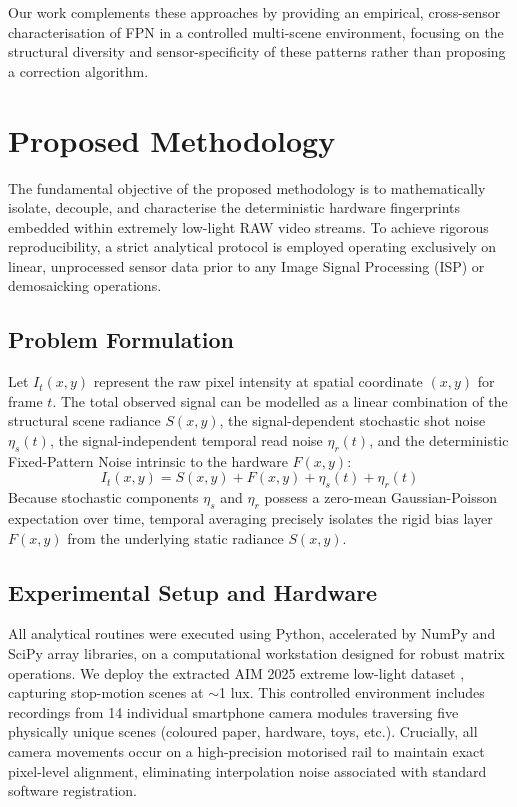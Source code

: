\documentclass[conference]{IEEEtran}
\begin{document}
Our work complements these approaches by providing an empirical, cross-sensor characterisation of FPN in a controlled multi-scene environment, focusing on the structural diversity and sensor-specificity of these patterns rather than proposing a correction algorithm.

\section{Proposed Methodology}

The fundamental objective of the proposed methodology is to mathematically isolate, decouple, and characterise the deterministic hardware fingerprints embedded within extremely low-light RAW video streams. To achieve rigorous reproducibility, a strict analytical protocol is employed operating exclusively on linear, unprocessed sensor data prior to any Image Signal Processing (ISP) or demosaicking operations.

\subsection{Problem Formulation}
Let $I_{t}(x,y)$ represent the raw pixel intensity at spatial coordinate $(x,y)$ for frame $t$. The total observed signal can be modelled as a linear combination of the structural scene radiance $S(x,y)$, the signal-dependent stochastic shot noise $\eta_{s}(t)$, the signal-independent temporal read noise $\eta_{r}(t)$, and the deterministic Fixed-Pattern Noise intrinsic to the hardware $F(x,y)$:
\begin{equation}
    I_{t}(x,y) = S(x,y) + F(x,y) + \eta_{s}(t) + \eta_{r}(t)
\end{equation}
Because stochastic components $\eta_{s}$ and $\eta_{r}$ possess a zero-mean Gaussian-Poisson expectation over time, temporal averaging precisely isolates the rigid bias layer $F(x,y)$ from the underlying static radiance $S(x,y)$.

\subsection{Experimental Setup and Hardware}
All analytical routines were executed using Python, accelerated by NumPy and SciPy array libraries, on a computational workstation designed for robust matrix operations. We deploy the extracted AIM 2025 extreme low-light dataset \cite{yakovenko2025aim}, capturing stop-motion scenes at $\sim$1 lux. This controlled environment includes recordings from 14 individual smartphone camera modules traversing five physically unique scenes (coloured paper, hardware, toys, etc.). Crucially, all camera movements occur on a high-precision motorised rail to maintain exact pixel-level alignment, eliminating interpolation noise associated with standard software registration.
\end{document}
